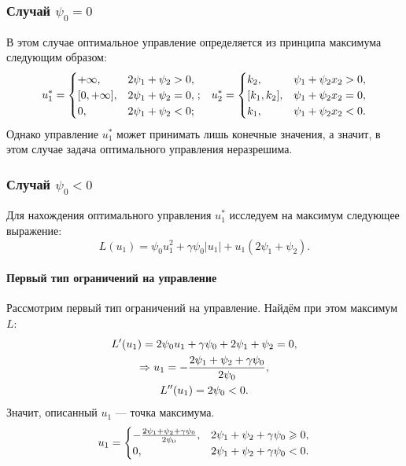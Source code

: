 \documentclass[11pt]{article}
\newcommand\abs[1]{\left\lvert#1\right\rvert}
\begin{document}
\subsubsection{Случай $\psi_0 = 0$}
В этом случае оптимальное управление определяется из принципа максимума следующим образом:
\begin{gather}
u_1^* =
\begin{cases}
+\infty, & 2\psi_1 + \psi_2 > 0, \\
[0, +\infty], & 2\psi_1 + \psi_2 = 0, \\
0, & 2\psi_1 + \psi_2 < 0;
\end{cases}; \; \; \;
u_2^* =
\begin{cases}
k_2, & \psi_1 + \psi_2 x_2 > 0, \\
[k_1, k_2], & \psi_1 + \psi_2 x_2 = 0, \\
k_1, & \psi_1 + \psi_2 x_2 < 0.
\end{cases} \notag
\end{gather}
Однако управление $u_1^*$ может принимать лишь конечные значения, а значит, в этом случае задача оптимального управления неразрешима.

\subsubsection{Случай $\psi_0 < 0$}

Для нахождения оптимального управления $u_1^*$ исследуем на максимум следующее выражение:
$$
L(u_1) = \psi_0 u_1^2 + \gamma \psi_0 \abs{u_1} + u_1(2\psi_1 + \psi_2).
$$

\paragraph{Первый тип ограничений на управление}

Рассмотрим первый тип ограничений на управление. Найдём при этом максимум $L$:
\begin{gather}
L'(u_1) = 2\psi_0 u_1 + \gamma \psi_0 + 2\psi_1 + \psi_2 = 0, \notag \\
\Rightarrow u_1 = - \frac{2\psi_1 + \psi_2 + \gamma\psi_0}{2\psi_0}, \notag\\
L''(u_1) = 2\psi_0 < 0. \notag
\end{gather}
Значит, описанный $u_1$ --- точка максимума.
\begin{gather}
u_1 = \begin{cases}
- \frac{2\psi_1 + \psi_2 + \gamma\psi_0}{2\psi_0}, & 2\psi_1 + \psi_2 + \gamma\psi_0 \geqslant 0, \\
0, & 2\psi_1 + \psi_2 + \gamma\psi_0 < 0.
\end{cases} \notag
\end{gather}
\end{document}
